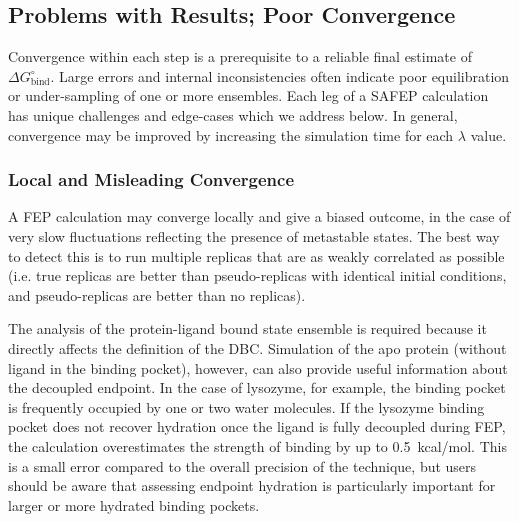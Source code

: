 \documentclass[9pt,tutorial,pubversion]{Styling/livecoms}
\begin{document}
\subsection{Problems with Results; Poor Convergence}

Convergence within each step is a prerequisite to a reliable final estimate of $\Delta G^\circ_\mathrm{bind}$. Large errors and internal inconsistencies often indicate poor equilibration or under-sampling of one or more ensembles. Each leg of a SAFEP calculation has unique challenges and edge-cases which we address below.
In general, convergence may be improved by increasing the simulation time for each $\lambda$ value.

\subsubsection{Local and Misleading Convergence}
A FEP calculation may converge locally and give a biased outcome, in the case of very slow fluctuations reflecting the presence of metastable states.
The best way to detect this is to run multiple replicas that are as weakly correlated as possible (i.e. true replicas are better than pseudo-replicas with identical initial conditions, and pseudo-replicas are better than no replicas).

The analysis of the protein-ligand bound state ensemble is required because it directly affects the definition of the DBC.
Simulation of the apo protein (without ligand in the binding pocket), however, can also provide useful information about the decoupled endpoint.
In the case of lysozyme, for example, the binding pocket is frequently occupied by one or two water molecules.
If the lysozyme binding pocket does not recover hydration once the ligand is fully decoupled during FEP, the calculation overestimates the strength of binding by up to 0.5~kcal/mol. This is a small error compared to the overall precision of the technique, but users should be aware that assessing endpoint hydration is particularly important for larger or more hydrated binding pockets. 
\end{document}
